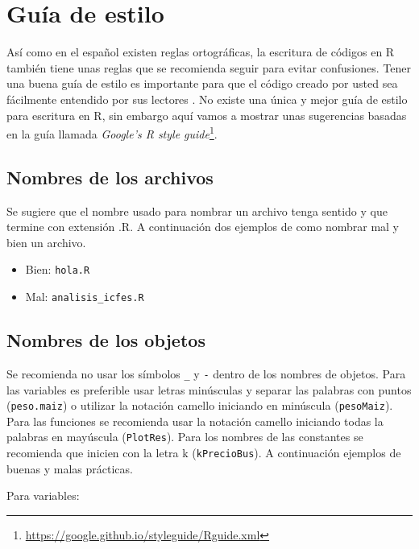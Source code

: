 \documentclass[10pt,]{krantz}
\providecommand{\tightlist}{%
  \setlength{\itemsep}{0pt}\setlength{\parskip}{0pt}}
\let\proglang=\textsf
\renewcommand{\href}[2]{#2\footnote{\url{#1}}}
\begin{document}
\chapter{\texorpdfstring{Guía de estilo 
\label{estilo}}{Guía de estilo  }}\label{guia-de-estilo}

Así como en el español existen reglas ortográficas, la escritura de
códigos en \proglang{R} también tiene unas reglas que se recomienda
seguir para evitar confusiones. Tener una buena guía de estilo
 es importante para que el código creado por usted
sea fácilmente entendido por sus lectores \citet{rpackages}. No existe
una única y mejor guía de estilo para escritura en \proglang{R}, sin
embargo aquí vamos a mostrar unas sugerencias basadas en la guía llamada
\href{https://google.github.io/styleguide/Rguide.xml}{\textit{Google's R style guide}}.

\section{Nombres de los archivos}\label{nombres-de-los-archivos}

Se sugiere que el nombre usado para nombrar un archivo tenga sentido y
que termine con extensión .R. A continuación dos ejemplos de como
nombrar mal y bien un archivo.

\begin{itemize}
\tightlist
\item
  Bien: \texttt{hola.R}
\item
  Mal: \texttt{analisis\_icfes.R}
\end{itemize}

\section{Nombres de los objetos}\label{nombres-de-los-objetos}

Se recomienda no usar los símbolos \texttt{\_} y \texttt{-} dentro de
los nombres de objetos. Para las variables es preferible usar letras
minúsculas y separar las palabras con puntos (\texttt{peso.maiz}) o
utilizar la notación camello iniciando en minúscula (\texttt{pesoMaiz}).
Para las funciones se recomienda usar la notación camello iniciando
todas la palabras en mayúscula (\texttt{PlotRes}). Para los nombres de
las constantes se recomienda que inicien con la letra k
(\texttt{kPrecioBus}). A continuación ejemplos de buenas y malas
prácticas.

Para variables:
\end{document}
